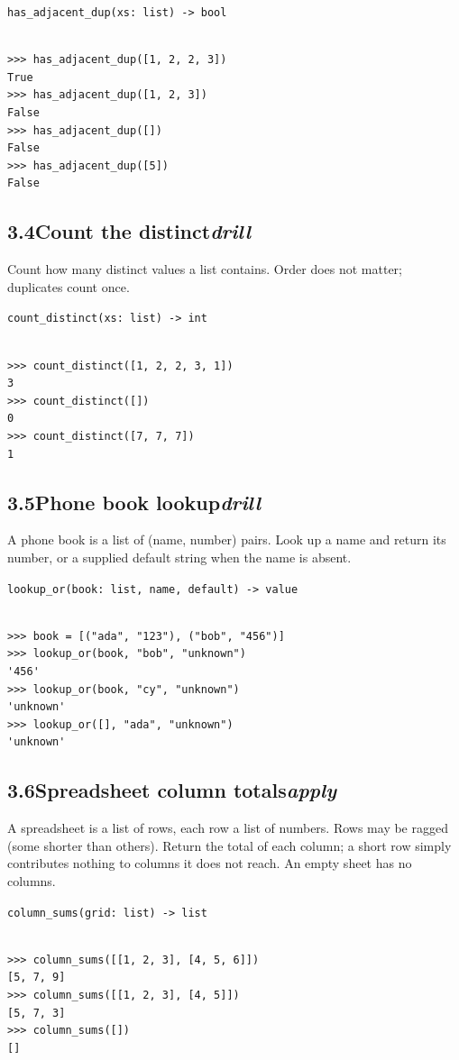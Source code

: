 \documentclass[10pt,letterpaper]{book}
\begin{document}
\noindent\texttt{has\_adjacent\_dup(xs: list) -> bool}
\begin{lstlisting}[style=ex]

>>> has_adjacent_dup([1, 2, 2, 3])
True
>>> has_adjacent_dup([1, 2, 3])
False
>>> has_adjacent_dup([])
False
>>> has_adjacent_dup([5])
False

\end{lstlisting}
\subsection*{3.4\quad Count the distinct\hfill\textnormal{\textit{drill}}}
Count how many distinct values a list contains. Order does not matter; duplicates count once.

\noindent\texttt{count\_distinct(xs: list) -> int}
\begin{lstlisting}[style=ex]

>>> count_distinct([1, 2, 2, 3, 1])
3
>>> count_distinct([])
0
>>> count_distinct([7, 7, 7])
1

\end{lstlisting}
\subsection*{3.5\quad Phone book lookup\hfill\textnormal{\textit{drill}}}
A phone book is a list of (name, number) pairs. Look up a name and return its number, or a supplied default string when the name is absent.

\noindent\texttt{lookup\_or(book: list, name, default) -> value}
\begin{lstlisting}[style=ex]

>>> book = [("ada", "123"), ("bob", "456")]
>>> lookup_or(book, "bob", "unknown")
'456'
>>> lookup_or(book, "cy", "unknown")
'unknown'
>>> lookup_or([], "ada", "unknown")
'unknown'

\end{lstlisting}
\subsection*{3.6\quad Spreadsheet column totals\hfill\textnormal{\textit{apply}}}
A spreadsheet is a list of rows, each row a list of numbers. Rows may be ragged (some shorter than others). Return the total of each column; a short row simply contributes nothing to columns it does not reach. An empty sheet has no columns.

\noindent\texttt{column\_sums(grid: list) -> list}
\begin{lstlisting}[style=ex]

>>> column_sums([[1, 2, 3], [4, 5, 6]])
[5, 7, 9]
>>> column_sums([[1, 2, 3], [4, 5]])
[5, 7, 3]
>>> column_sums([])
[]

\end{lstlisting}
\end{document}

